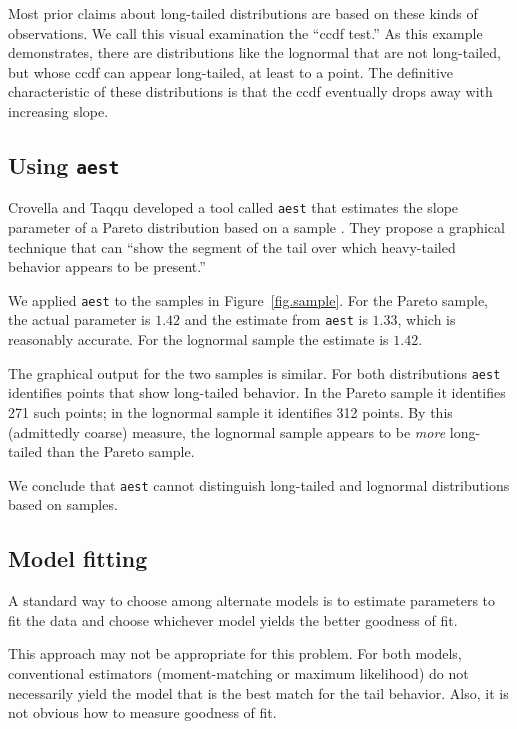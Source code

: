 \documentclass[twocolumn,11pt]{infocom}
\begin{document}
Most prior claims about long-tailed distributions are based on these
kinds of observations.  We call this visual examination the
``ccdf test.''  As this example demonstrates, there are distributions
like the lognormal that are not long-tailed, but whose ccdf can appear
long-tailed, at least to a point.  The definitive characteristic of
these distributions is that the ccdf eventually drops away with
increasing slope.


\subsection {Using \texttt{aest}}

Crovella and Taqqu developed a tool called
\texttt{aest} that estimates the slope parameter of a
Pareto distribution based on a sample
\cite{CrovellaTaqqu99}.  They propose a graphical technique
that can ``show the segment of the tail over which
heavy-tailed behavior appears to be present.''

We applied \texttt{aest} to the samples in Figure~\ref{fig.sample}.
For the Pareto sample, the actual parameter is $1.42$ and the
estimate from \texttt{aest} is $1.33$, which is reasonably accurate.
For the lognormal sample the estimate is $1.42$.

The graphical output for the two samples is similar.
For both distributions \texttt{aest} identifies points
that show long-tailed behavior.  In the Pareto sample it
identifies 271 such points; in the lognormal sample it identifies
312 points.  By this (admittedly coarse) measure, the lognormal
sample appears to be {\em more} long-tailed than the Pareto sample.

We conclude that \texttt{aest} cannot distinguish long-tailed
and lognormal distributions based on samples.


\subsection {Model fitting}

A standard way to choose among alternate models is to estimate
parameters to fit the data and choose whichever model yields the
better goodness of fit.

This approach may not be appropriate for this problem.  For both
models, conventional estimators (moment-matching or maximum
likelihood) do not necessarily yield the model that is the best
match for the tail behavior.
Also, it is not obvious how to measure goodness of fit.
\end{document}
